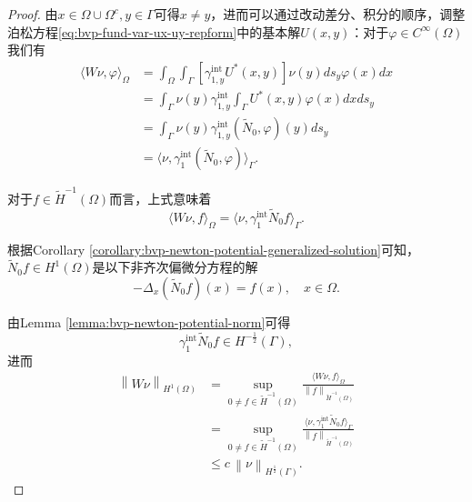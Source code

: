 \begin{proof}
  由$x \in \Omega \cup \Omega^{c}, y \in \Gamma$可得$x \neq y$，进而可以通过改动差分、积分的顺序，调整泊松方程\eqref{eq:bvp-fund-var-ux-uy-repform}中的基本解$U(x,y)$：对于$\varphi \in C^{\infty}(\Omega)$我们有
  \begin{equation*}
    \begin{split}
      \langle W \nu, \varphi \rangle_{\Omega}
      &= \int_{\Omega}
      \int_{\Gamma}
      \left[
      \gamma_{1,y}^{\text{int}} U^{*}(x,y)
      \right]
      \nu(y)
      d s_y
      \varphi(x)
      dx\\
      &= \int_{\Gamma}
      \nu(y)
      \gamma_{1,y}^{\text{int}}
      \int_{\Gamma}
      U^{*}(x,y)
      \varphi(x)
      d x
      d s_y \\
      &=
      \int_{\Gamma} \nu(y) \gamma_{1,y}^{\text{int}} \left( \widetilde{N}_{0}, \varphi \right)(y)
      d s_y\\
      &=\langle \nu, \gamma_{1}^{\text{int}} \left( \widetilde{N}_{0}, \varphi \right) \rangle_{\Gamma}.
    \end{split}
  \end{equation*}

对于$f \in \widetilde{H}^{-1}(\Omega)$而言，上式意味着
\begin{equation*}
  \langle W \nu, f \rangle_{\Omega} = \langle \nu, \gamma_{1}^{\text{int}} \widetilde{N}_{0} f \rangle_{\Gamma}.
\end{equation*}

根据Corollary \ref{corollary:bvp-newton-potential-generalized-solution}可知，$\widetilde{N}_{0} f \in H^{1}(\Omega)$是以下非齐次偏微分方程的解
\begin{equation*}
  - \Delta_{x} \left( \widetilde{N}_{0} f \right) (x) = f(x), \quad x \in \Omega.
\end{equation*}

由Lemma \ref{lemma:bvp-newton-potential-norm}可得
\begin{equation*}
  \gamma_{1}^{\text{int}} \widetilde{N}_{0} f \in H^{-\frac{1}{2}}(\Gamma),
\end{equation*}
进而
\begin{equation*}
  \begin{split}
    \left\| W \nu \right\|_{H^{1}(\Omega)}
    &= \sup_{0 \neq f \in \widetilde{H}^{-1}(\Omega)}
    \frac{
    \langle W \nu, f \rangle_{\Omega}
    }{
    \left\| f \right\|_{\widetilde{H}^{-1}(\Omega)}
    }\\
    &=\sup_{0 \neq f \in \widetilde{H}^{-1}(\Omega)}
    \frac{
    \langle \nu, \gamma_{1}^{\text{int}} \widetilde{N}_{0} f \rangle_{\Gamma}
    }{
    \left\| f \right\|_{\widetilde{H}^{-1}(\Omega)}
    }\\
    & \le c \, \left\| \nu \right\|_{H^{\frac{1}{2}}(\Gamma)}.
  \end{split}
\end{equation*}
\end{proof}

